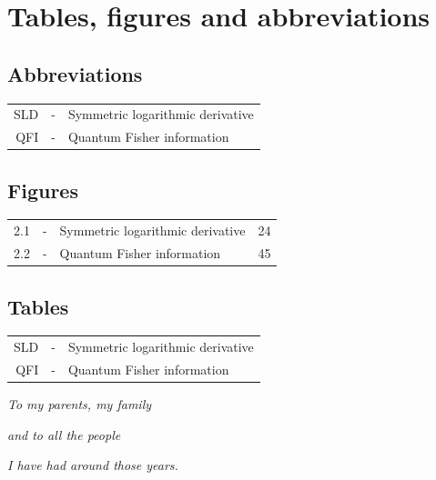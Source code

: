 \documentclass[12pt, letterpaper, twoside]{article}
\numberwithin{equation}{section}
\numberwithin{figure}{section}
\numberwithin{table}{section}
\begin{document}
\vspace*{100pt}
\tableofcontents

\section*{Tables, figures and abbreviations}
\fancyfoot[LE,RO]{\thepage}
\subsection*{Abbreviations}
\begin{tabular}{r c l}
  SLD & - & Symmetric logarithmic derivative \\
  QFI & - & Quantum Fisher information \\
\end{tabular}
 
\subsection*{Figures}

\begin{tabularx}{\textwidth}{r c X r}
  2.1 & - & Symmetric logarithmic derivative \dotfill & 24\\
  2.2 & - & Quantum Fisher information \dotfill & 45\\
\end{tabularx}

\subsection*{Tables}
\begin{tabular}{r c l}
  SLD & - & Symmetric logarithmic derivative \\
  QFI & - & Quantum Fisher information \\
\end{tabular}


\cleardoublepage

\fancyfoot{}

\cleardoublepage
\setcounter{page}{1}

\vspace*{100pt}
\begin{center}
\emph{To my parents, my family}

\emph{and to all the people}

\emph{I have had around those years.}
\end{center}
\end{document}
